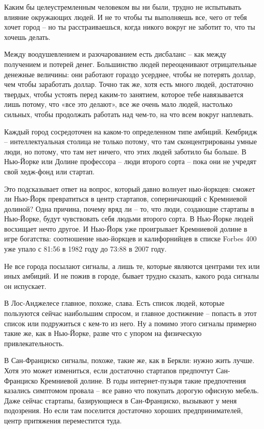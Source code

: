\documentclass[ebook,12pt,oneside,openany]{memoir}
\begin{document}
Каким бы целеустремленным человеком вы ни были, трудно не испытывать
влияние окружающих людей. И не то чтобы ты выполняешь все, чего от
тебя хочет город – но ты расстраиваешься, когда никого вокруг не
заботит то, что ты хочешь делать. \newline

Между воодушевлением и разочарованием есть дисбаланс – как между
получением и потерей денег. Большинство людей переоценивают
отрицательные денежные величины: они работают гораздо усерднее, чтобы
не потерять доллар, чем чтобы заработать доллар. Точно так же, хотя
есть много людей, достаточно твердых, чтобы устоять перед каким-то
занятием, которое тебе навязывается лишь потому, что «все это делают»,
все же очень мало людей, настолько сильных, чтобы продолжать работать
над чем-то, на что всем вокруг наплевать. \newline

Каждый город сосредоточен на каком-то определенном типе амбиций.
Кембридж – интеллектуальная столица не только потому, что там
сконцентрированы умные люди, но потому, что там нет ничего, что этих
людей заботило бы больше. В Нью-Йорке или Долине профессора – люди
второго сорта – пока они не учредят свой хедж-фонд или стартап. \newline

Это подсказывает ответ на вопрос, который давно волнует нью-йоркцев:
сможет ли Нью-Йорк превратиться в центр стартапов, соперничающий с
Кремниевой долиной? Одна причина, почему вряд ли – то, что люди,
создающие стартапы в Нью-Йорке, будут чувствовать себя людьми второго
сорта. В Нью-Йорке людей восхищает нечто другое. И Нью-Йорк уже
проигрывает Кремниевой долине в игре богатства: соотношение
нью-йоркцев и калифорнийцев в списке Forbes 400 уже упало с 81:56 в
1982 году до 73:88 в 2007 году. \newline

Не все города посылают сигналы, а лишь те, которые являются центрами
тех или иных амбиций. И не пожив в городе, бывает трудно сказать,
какого рода сигналы он испускает. \newline

В Лос-Анджелесе главное, похоже, слава. Есть список людей, которые
пользуются сейчас наибольшим спросом, и главное достижение – попасть в
этот список или подружиться с кем-то из него. Ну а помимо этого
сигналы примерно такие же, как в Нью-Йорке, разве что с упором на
физическую привлекательность. \newline

В Сан-Франциско сигналы, похоже, такие же, как в Беркли: нужно жить
лучше. Хотя это может измениться, если достаточно стартапов предпочтут
Сан-Франциско Кремниевой долине. В годы интернет-пузыря такие
предпочтения казались симптомом провала – все равно что покупать
дорогую офисную мебель. Даже сейчас стартапы, базирующиеся в
Сан-Франциско, вызывают у меня подозрения. Но если там поселится
достаточно хороших предпринимателей, центр притяжения переместится
туда. \newline
\end{document}

